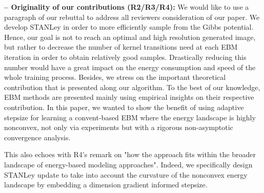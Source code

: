 \documentclass[10pt,twocolumn,letterpaper]{article}
\begin{document}
\noindent \textbf{-- Originality of our contributions (R2/R3/R4):}
We would like to use a paragraph of our rebuttal to address all reviewers consideration of our paper.
We develop STANLey in order to more efficiently sample from the Gibbs potential. Hence, our goal is not to reach an optimal and high resolution generated image, but rather to decrease the number of kernel transitions need at each EBM iteration in order to obtain relatively good samples.
Drastically reducing this number would have a great impact on the energy consumption and speed of the whole training process.
Besides, we stress on the important theoretical contribution that is presented along our algorithm. 
To the best of our knowledge, EBM methods are presented mainly using empirical insights on their respective contribution.
In this paper, we wanted to show the benefit of using adaptive stepsize for learning a convent-based EBM where the energy landscape is highly nonconvex, not only via experiments but with a rigorous non-asymptotic convergence analysis.

This also echoes with R4's remark on "how the approach fits within the broader landscape of energy-based modeling approaches". 
Indeed, we specifically design STANLey update to take into account the curvature of the nonconvex energy landscape by embedding a dimension gradient informed stepsize.




% 
% 
\end{document}
